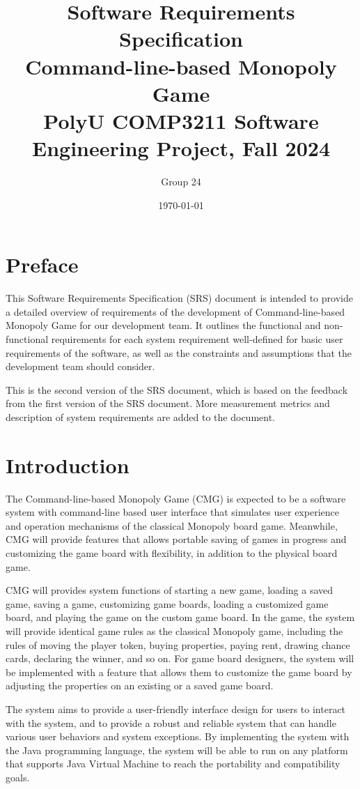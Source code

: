 \documentclass{article}
\title{\textbf{Software Requirements Specification} \\ {\textbf{Command-line-based Monopoly Game}}\\ {\large PolyU COMP3211 Software Engineering Project, Fall 2024}}
\author{\large Group 24}
\date{\today}
\begin{document}
\maketitle{}

\tableofcontents

\section{Preface}

This Software Requirements Specification (SRS) document is intended to provide a detailed overview of requirements of the development of Command-line-based Monopoly Game for our development team. 
It outlines the functional and non-functional requirements for each system requirement well-defined for basic user requirements of the software, as well as the constraints and assumptions that the development team should consider.

This is the second version of the SRS document, which is based on the feedback from the first version of the SRS document. More measurement metrics and description of system requirements are added to the document.

\section{Introduction}

The Command-line-based Monopoly Game (CMG) is expected to be a software system with command-line based user interface that simulates user experience and operation mechanisms of the classical Monopoly board game.
Meanwhile, CMG will provide features that allows portable saving of games in progress and customizing the game board with flexibility, in addition to the physical board game. 

CMG will provides system functions of starting a new game, loading a saved game, saving a game, customizing game boards, loading a customized game board, and playing the game
on the custom game board. In the game, the system will provide identical game rules as the classical Monopoly game, including the rules of moving the player token, buying properties, paying rent, drawing chance cards, declaring the winner, and so on.
For game board designers, the system will be implemented with a feature that allows them to customize the game board by adjusting the properties on an existing or a saved game board.

The system aims to provide a user-friendly interface design for users to interact with the system, and to provide a robust and reliable system that can handle various user behaviors and system exceptions.
By implementing the system with the Java programming language, the system will be able to run on any platform that supports Java Virtual Machine to reach the portability and compatibility goals.
\end{document}
